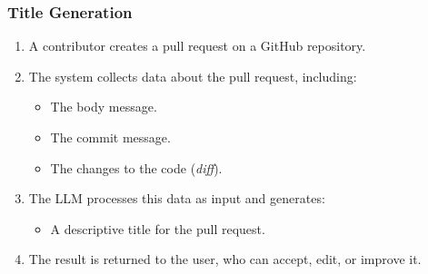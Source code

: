 \begin{itemize}
\subsubsection{Title Generation}
\begin{enumerate}
\item A contributor creates a pull request on a GitHub repository.
\item The system collects data about the pull request, including:
\begin{itemize}
\item The body message.
\item The commit message.
\item The changes to the code (\textit{diff}).
\end{itemize}
\item The LLM processes this data as input and generates:
\begin{itemize}
\item A descriptive title for the pull request.
\end{itemize}
\item The result is returned to the user, who can accept, edit, or improve it.
\end{enumerate}
\end{itemize}
